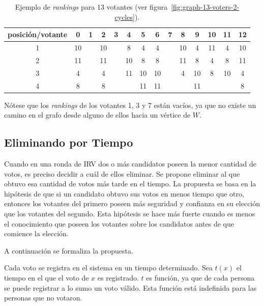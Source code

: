 \begin{table}[h!]
    \centering
    \begin{tabular}{|c|c|c|c|c|c|c|c|c|c|c|c|c|c|}
        \hline
        posici\'on/votante & 0  & 1  & 2  & 3  & 4  & 5  & 6  & 7  & 8  & 9  & 10 & 11 & 12 \\ \hline
        1                  & 10 &    & 10 &    & 8  & 4  & 4  &    & 10 & 4  & 11 & 4  & 10 \\ \hline
        2                  & 11 &    & 11 &    & 10 & 8  & 8  &    & 11 & 8  & 4  & 8  & 11 \\ \hline
        3                  & 4  &    & 4  &    & 11 & 10 & 10 &    & 4  & 10 & 8  & 10 & 4  \\ \hline
        4                  & 8  &    & 8  &    &    & 11 & 11 &    &    & 11 &    &    & 8  \\ \hline
    \end{tabular}
    \caption{Ejemplo de \textit{rankings} para 13 votantes (ver figura~\ref{fig:graph-13-voters-2-cycles}).}
    \label{tab:rankings-13-voters}
\end{table}

N\'otese que los \textit{rankings}  de los votantes 1, 3 y 7 est\'an vac\'ios, ya que no existe un camino en el grafo desde alguno de ellos hacia un v\'ertice de $W$.

\subsection{Eliminando por Tiempo}\label{sec:irv+time-untie:removing}
Cuando en una ronda de IRV dos o m\'as candidatos poseen la menor cantidad de votos, es preciso decidir a cu\'al de ellos eliminar. Se propone eliminar al que obtuvo esa cantidad de votos m\'as tarde en el tiempo. La propuesta se basa en la hip\'otesis de que si un candidato obtuvo sus votos en menos tiempo que otro, entonces los votantes del primero poseen m\'as seguridad y confianza en su elecci\'on que los votantes del segundo. Esta hip\'otesis se hace m\'as fuerte cuando es menos el conocimiento que poseen los votantes sobre los candidatos antes de que comience la elecci\'on. 

A continuaci\'on se formaliza la propuesta.


Cada voto se registra en el sistema en un tiempo determinado. Sea $t(x)$ el tiempo en el que el voto de $x$ es registrado. $t$ es funci\'on, ya que de cada persona se puede registrar a lo sumo un voto v\'alido. Esta funci\'on est\'a indefinida para las personas que no votaron.

